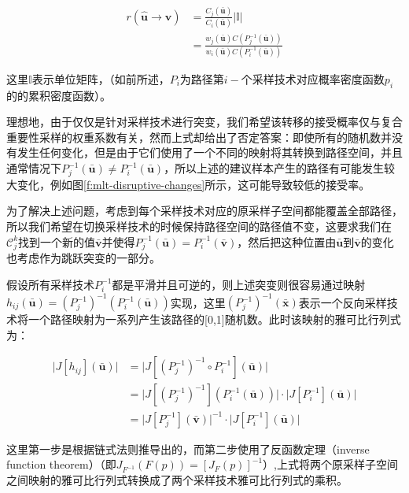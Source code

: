 \begin{equation}
\begin{aligned}
	r(\hat{\mathbf{u}}\to\hat{\mathbf{v}})&=\frac{C_j(\bar{\mathbf{u}})}{C_i(\bar{\mathbf{u}})}|\mathds{I}|\\
	&=\frac{w_j(\bar{\mathbf{u}})C(P^{-1}_j(\bar{\mathbf{u}}))}{w_i(\bar{\mathbf{u}})C(P^{-1}_i(\bar{\mathbf{u}}))}
\end{aligned}
\end{equation}

\noindent 这里$\mathds{I}$表示单位矩阵，（如前所述，$P_i$为路径第$i-$个采样技术对应概率密度函数$p_i$的的累积密度函数）。

理想地，由于仅仅是针对采样技术进行突变，我们希望该转移的接受概率仅与复合重要性采样的权重系数有关，然而上式却给出了否定答案：即使所有的随机数并没有发生任何变化，但是由于它们使用了一个不同的映射将其转换到路径空间，并且通常情况下$P^{-1}_j(\bar{\mathbf{u}})\neq P^{-1}_i(\bar{\mathbf{u}})$，所以上述的建议样本产生的路径有可能发生较大变化，例如图\ref{f:mlt-disruptive-changes}所示，这可能导致较低的接受率。

为了解决上述问题，考虑到每个采样技术对应的原采样子空间都能覆盖全部路径，所以我们希望在切换采样技术的时候保持路径空间的路径值不变，这要求我们在$\mathscr{C}^{k}_j$找到一个新的值$\bar{\mathbf{v}}$并使得$P^{-1}_j(\bar{\mathbf{u}})=P^{-1}_i(\bar{\mathbf{v}})$，然后把这种位置由$\bar{\mathbf{u}}$到$\bar{\mathbf{v}}$的变化也考虑作为跳跃突变的一部分。

假设所有采样技术$P^{-1}_i$都是平滑并且可逆的，则上述突变则很容易通过映射$h_{ij}(\bar{\mathbf{u}})=(P^{-1}_j)^{-1}(P^{-1}_i(\bar{\mathbf{u}}))$实现，这里$(P^{-1}_j)^{-1}(\bar{\mathbf{x}})$表示一个反向采样技术将一个路径映射为一系列产生该路径的[0,1]随机数。此时该映射的雅可比行列式为：

\begin{equation}
\begin{aligned}
	\big|J[h_{ij}](\bar{\mathbf{u}})\big|&=\big|J[(P^{-1}_j)^{-1}\circ P^{-1}_i](\bar{\mathbf{u}})\big|\\
	&=\big|J[(P^{-1}_j)^{-1}](P^{-1}_i(\bar{\mathbf{u}}))\big|\cdot\big|J[P^{-1}_i](\bar{\mathbf{u}})\big|\\
	&=\big|J[P^{-1}_j](\bar{\mathbf{v}})\big|^{-1}\cdot\big|J[P^{-1}_i](\bar{\mathbf{u}})\big|
\end{aligned}
\end{equation}

\noindent 这里第一步是根据链式法则推导出的，而第二步使用了反函数定理（inverse function theorem）（即$J_{F^{-1}}(F(p))=[J_F(p)]^{-1}$）,上式将两个原采样子空间之间映射的雅可比行列式转换成了两个采样技术雅可比行列式的乘积。


